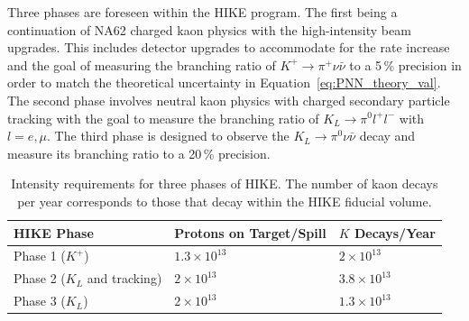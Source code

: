 \documentclass[../../main.tex]{subfiles}
\begin{document}
    Three phases are foreseen within the HIKE program. The first being a continuation of NA62 charged kaon physics with the high-intensity beam upgrades. This includes detector upgrades to accommodate for the rate increase and the goal of measuring the branching ratio of $K^+ \to \pi^+ \nu \bar\nu$ to a 5\,\% precision in order to match the theoretical uncertainty in Equation~\ref{eq:PNN_theory_val}. The second phase involves neutral kaon physics with charged secondary particle tracking with the goal to measure the branching ratio of $K_L \to \pi^0 l^+ l^-$ with $l = e,\mu$. 
    The third phase is designed to observe the $K_{L} \to \pi^{0}\nu\bar{\nu}$ decay and measure its branching ratio to a 20\,\% precision. 
    \begin{table}[htbp]
        \centering
        \begin{tabular}{|l|l|l|}
        \hline
        \textbf{HIKE Phase} & \textbf{Protons on Target/Spill} & $ K $ \textbf{Decays/Year} \\ \hline
        Phase 1 ($ K^+ $)         & $ 1.3 \times 10^{13} $ & $ 2 \times 10^{13} $ \\ \hline
        Phase 2 ($ K_L $ and tracking) & $ 2 \times 10^{13} $   & $ 3.8 \times 10^{13} $ \\ \hline
        Phase 3 ($ K_L $)   & $ 2 \times 10^{13} $   & $ 1.3 \times 10^{13} $\\ \hline
        \end{tabular}
        \caption{Intensity requirements for three phases of HIKE. The number of kaon decays per year corresponds to those that decay within the HIKE fiducial volume.}
        \label{tab:hikePhases}
    \end{table}
\end{document}
